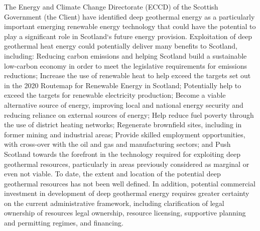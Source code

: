 The Energy and Climate Change Directorate (ECCD) of the Scottish Government (the Client)
have identified deep geothermal energy as a particularly important emerging renewable energy
technology that could have the potential to play a significant role in Scotland‘s future energy
provision.
Exploitation of deep geothermal heat energy could potentially deliver many benefits to Scotland,
including:
Reducing carbon emissions and helping Scotland build a sustainable low-carbon economy
in order to meet the legislative requirements for emissions reductions;
Increase the use of renewable heat to help exceed the targets set out in the 2020
Routemap for Renewable Energy in Scotland;
Potentially help to exceed the targets for renewable electricity production;
Become a viable alternative source of energy, improving local and national energy security
and reducing reliance on external sources of energy;
Help reduce fuel poverty through the use of district heating networks;
Regenerate brownfield sites, including in former mining and industrial areas;
Provide skilled employment opportunities, with cross-over with the oil and gas and
manufacturing sectors; and
Push Scotland towards the forefront in the technology required for exploiting deep
geothermal resources, particularly in areas previously considered as marginal or even not
viable.
To date, the extent and location of the potential deep geothermal resources has not been well
defined. In addition, potential commercial investment in development of deep geothermal energy
requires greater certainty on the current administrative framework, including clarification of legal
ownership of resources legal ownership, resource licensing, supportive planning and permitting
regimes, and financing.

